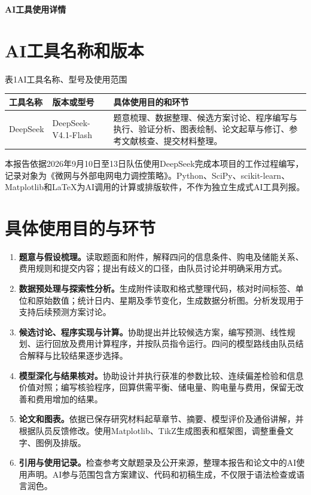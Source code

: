 \documentclass[UTF8,a4paper,12pt]{ctexart}
\begin{document}
\begin{center}\LARGE\bfseries AI工具使用详情\end{center}
\vspace{3pt}

\section{AI工具名称和版本}
\begin{center}
\small 表1\quad AI工具名称、型号及使用范围\par\vspace{5pt}
\renewcommand{\arraystretch}{1.35}
\begin{tabularx}{\linewidth}{@{}p{2.9cm}p{3.5cm}X@{}}
\toprule
工具名称 & 版本或型号 & 具体使用目的和环节\\
\midrule
DeepSeek & DeepSeek-V4.1-Flash & 题意梳理、数据整理、候选方案讨论、程序编写与执行、验证分析、图表绘制、论文起草与修订、参考文献核查、提交材料整理。\\
\bottomrule
\end{tabularx}
\end{center}

本报告依据2026年9月10日至13日队伍使用DeepSeek完成本项目的工作过程编写，记录对象为《微网与外部电网电力调控策略》。Python、SciPy、scikit-learn、Matplotlib和LaTeX为AI调用的计算或排版软件，不作为独立生成式AI工具列报。

\section{具体使用目的与环节}
\begin{enumerate}[label=\arabic*、]
\item \textbf{题意与假设梳理。}读取题面和附件，解释四问的信息条件、购电及储能关系、费用规则和提交内容；提出有歧义的口径，由队员讨论并明确采用方式。
\item \textbf{数据预处理与探索性分析。}生成附件读取和格式整理代码，核对时间标签、单位和原始数值；统计日内、星期及季节变化，生成数据分析图。分析发现用于支持后续预测方案讨论。
\item \textbf{候选讨论、程序实现与计算。}协助提出并比较候选方案，编写预测、线性规划、运行回放及费用计算程序，并按队员指令运行。四问的模型路线由队员结合解释与比较结果逐步选择。
\item \textbf{模型深化与结果核对。}协助设计并执行获准的参数比较、连续偏差检验和信息价值对照；编写核验程序，回算供需平衡、储电量、购电量与费用，保留无改善和费用增加的结果。
\item \textbf{论文和图表。}依据已保存研究材料起草章节、摘要、模型评价及通俗讲解，并根据队员反馈修改。使用Matplotlib、TikZ生成图表和框架图，调整重叠文字、图例及排版。
\item \textbf{引用与使用记录。}检查参考文献题录及公开来源，整理本报告和论文中的AI使用声明。AI参与范围包含方案建议、代码和初稿生成，不仅限于语法检查或语言润色。
\end{enumerate}
\end{document}
